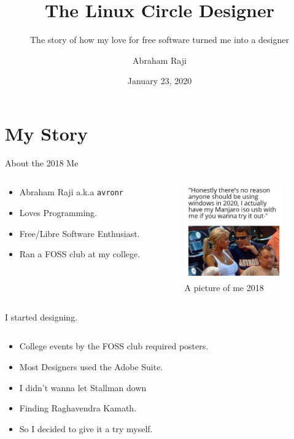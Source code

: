 \documentclass[presentation]{beamer}
\author{Abraham Raji}
\date{January 23, 2020}
\title{The Linux Circle Designer}
\subtitle{The story of how my love for free software turned me into a designer}}
\begin{document}
\maketitle

\section*{My Story}
\label{sec:orgfe801a6}
\begin{frame}[label={sec:orgbc8cf46},fragile]{About the 2018 Me}
 \begin{columns}
\begin{column}{0.5\columnwidth}
\begin{itemize}
\item Abraham Raji a.k.a \texttt{avronr}
\item Loves Programming.
\item Free/Libre Software Enthusiast.
\item Ran a FOSS club at my college.
\end{itemize}
\end{column}
\begin{column}{0.5\columnwidth}
\begin{figure}[htbp]
\centering
\includegraphics[height=40mm]{././meold.png}
\caption{A picture of me 2018}
\end{figure}
\end{column}
\end{columns}
\end{frame}
\begin{frame}[label={sec:org0d6dc39}]{I started designing.}
\begin{columns}
\begin{column}{0.7\columnwidth}
\begin{itemize}
\item College events by the FOSS club required posters.
\item Most Designers used the Adobe Suite.
\item I didn't wanna let Stallman down
\item Finding Raghavendra Kamath.
\item So I decided to give it a try myself.
\end{itemize}
\end{column}
\end{columns}
\end{frame}
\end{document}
